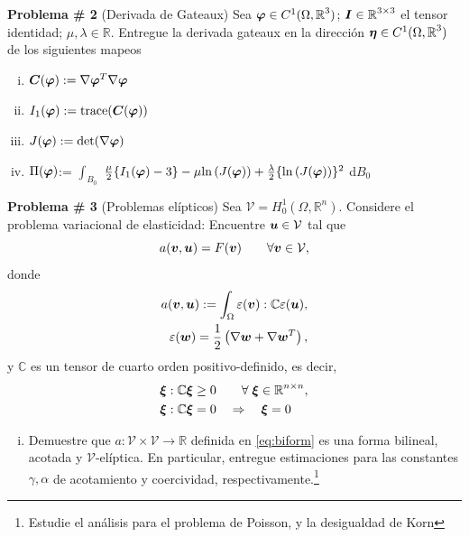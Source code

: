 \documentclass[11pt,letterpaper]{article}
\def\R{\mbox{\(\mathbb{R}\)}}
\def\vec   #1{\mbox{\boldmath $#1$}{}}
\def\ten   #1{\mbox{\boldmath $#1$}{}}
\DeclareMathOperator{\trace}{trace}
\begin{document}
\newpage


{\bf Problema \# 2} (Derivada de Gateaux) Sea $\vec \varphi \in C^1(\Omega,\R^3)$; $\ten I \in \R^{3 \times 3}$ el tensor identidad; $\mu, \lambda \in \R$.
Entregue la derivada gateaux en la direcci\'on $\vec \eta \in C^1(\Omega,\R^3)$ de los siguientes mapeos

\begin{enumerate}[i)]
	\item $\ten C(\vec \varphi):= \nabla \vec \varphi^T \nabla \vec \varphi$
	\item $I_1(\vec \varphi) := \trace(\ten C(\vec \varphi)) $
	\item $J(\vec \varphi) := \det (\nabla \vec \varphi) $
	\item $\Pi(\vec \varphi)$:= $\int_{B_0}^{}$ $\frac{\mu}{2} \{ I_1(\vec \varphi)  -3 \} - \mu \text{ln} \left( J(\vec \varphi) \right)+\frac{\lambda}{2} \{\text{ln} \left(J(\vec \varphi)\right) \}^2$ d$B_0$
\end{enumerate}



\vspace{10pt}
		
{\bf Problema \# 3} (Problemas el\'ipticos) Sea $\mathcal{V} = H^1_{0}(\Omega, \R^n)$. Considere el problema variacional de elasticidad: Encuentre $\vec u \in \mathcal{V}$ tal que
\begin{equation*}
	a(\vec v, \vec u) = F(\vec v) \qquad \forall \vec v \in \mathcal{V},
\end{equation*}
donde
\begin{align}
	a(\vec v, \vec u):= \int_{\Omega} \varepsilon(\vec v) : \mathbb{C} \varepsilon(\vec u), \label{eq:biform}\\
	\varepsilon(\vec w) = \frac{1}{2}\left( \nabla \vec w + \nabla \vec w^T\right), \notag
\end{align}
y $\mathbb{C}$ es un tensor de cuarto orden positivo-definido, es decir, 
\begin{align*}
	\vec \xi : \mathbb{C} \vec \xi & \geq 0 \qquad \forall \; \vec \xi \in \R^{n\times n},\\
	\vec \xi : \mathbb{C} \vec \xi & = 0 \quad \Rightarrow \quad \vec \xi = 0
\end{align*}
\begin{enumerate}[i)]
	\item Demuestre que $a:\mathcal{V} \times \mathcal{V} \to \R$ definida en \eqref{eq:biform} es una forma bilineal, acotada y $\mathcal{V}$-el\'iptica. En particular, entregue estimaciones para las constantes $\gamma, \alpha$ de acotamiento y coercividad, respectivamente.\footnote{Estudie el an\'alisis para el problema de Poisson, y la desigualdad de Korn}
\end{enumerate}
\end{document}
